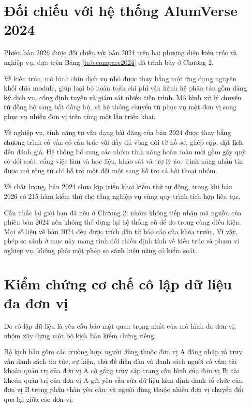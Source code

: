 \documentclass[12pt,a4paper,oneside]{report}
\begin{document}
\section{Đối chiếu với hệ thống AlumVerse 2024}

Phiên bản 2026 được đối chiếu với bản 2024 trên hai phương diện kiến trúc và nghiệp vụ, dựa trên Bảng \ref{tab:compare2024} đã trình bày ở Chương 2.

Về kiến trúc, mô hình chín dịch vụ nhỏ được thay bằng một ứng dụng nguyên khối chia module, giúp loại bỏ hoàn toàn chi phí vận hành hệ phân tán gồm đăng ký dịch vụ, cổng định tuyến và giám sát nhiều tiến trình. Mô hình xử lý chuyển từ đồng bộ sang bất đồng bộ, và hệ thống chuyển từ phục vụ một đơn vị sang phục vụ nhiều đơn vị trên cùng một lần triển khai.

Về nghiệp vụ, tính năng tư vấn dạng bài đăng của bản 2024 được thay bằng chương trình cố vấn có cấu trúc với đầy đủ vòng đời từ hồ sơ, ghép cặp, đặt lịch đến đánh giá. Hệ thống bổ sung các nhóm tính năng hoàn toàn mới gồm gây quỹ có đối soát, cổng việc làm và học liệu, khảo sát và trợ lý ảo. Tính năng nhắn tin được mở rộng từ chỉ hỗ trợ một đối một sang hỗ trợ cả hội thoại nhóm.

Về chất lượng, bản 2024 chưa kịp triển khai kiểm thử tự động, trong khi bản 2026 có 215 hàm kiểm thử cho tầng nghiệp vụ cùng quy trình tích hợp liên tục.

Cần nhắc lại giới hạn đã nêu ở Chương 2: nhóm không tiếp nhận mã nguồn của phiên bản 2024 nên không thể dựng lại hệ thống cũ để đo trong cùng điều kiện. Mọi số liệu về bản 2024 đều được trích dẫn từ báo cáo của khóa trước. Vì vậy, phép so sánh ở mục này mang tính đối chiếu định tính về kiến trúc và phạm vi nghiệp vụ, không phải một phép so sánh hiệu năng có kiểm soát.

\section{Kiểm chứng cơ chế cô lập dữ liệu đa đơn vị}

Do cô lập dữ liệu là yêu cầu bảo mật quan trọng nhất của mô hình đa đơn vị, nhóm xây dựng một bộ kịch bản kiểm chứng riêng.

Bộ kịch bản gồm các trường hợp: người dùng thuộc đơn vị A đăng nhập và truy vấn danh sách tin tức, sự kiện, chủ đề diễn đàn và danh sách người cố vấn; tài khoản quản trị của đơn vị A cố gắng truy cập trang cấu hình của đơn vị B; tài khoản quản trị của đơn vị A gửi yêu cầu sửa dữ liệu kèm định danh tổ chức của đơn vị B trong phần thân yêu cầu; và người dùng thuộc nhiều đơn vị chuyển đổi qua lại giữa các đơn vị.
\end{document}

